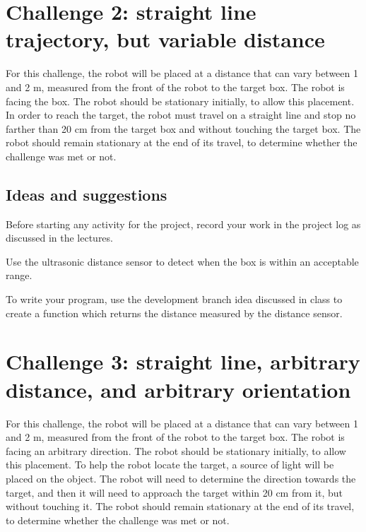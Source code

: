 \documentclass[12pt]{book}
\begin{document}

\section{Challenge 2: straight line trajectory, but variable distance}
\label{proj2:chap} 

For this challenge, the robot will be placed at a distance that can
vary between 1 and 2 m, measured from the front of the robot to the
target box. The robot is facing the box. The robot should be stationary
initially, to allow this placement. In order to reach the target, the
robot must travel on a straight line and stop no farther than 20 cm
from the target box and without touching the target box. The robot
should remain stationary at the end of its travel, to determine whether
the challenge was met or not.

\subsection{Ideas and suggestions}

\begin{compactenum}[1)]
  \item Before starting any activity for the project, record your work
    in the project log as discussed in the lectures.
\item Use the ultrasonic distance sensor to detect when the box is
  within an acceptable range.
  \item To write your program, use the development branch idea
    discussed in class to create a function which returns the distance
    measured by the distance sensor.
\end{compactenum}



\section{Challenge 3: straight line, arbitrary distance, and arbitrary
orientation}

For this challenge, the robot will be placed at a distance that can
vary between 1 and 2 m, measured from the front of the robot to the
target box. The robot is facing an arbitrary direction. The robot
should be stationary initially, to allow this placement. To help the
robot locate the target, a source of light will be placed on the
object. The robot will need to determine the direction towards the
target, and then it will need to approach the target within 20 cm from
it, but without touching it. The robot should remain
stationary at the end of its travel, to determine whether the challenge
was met or not.
\end{document}
